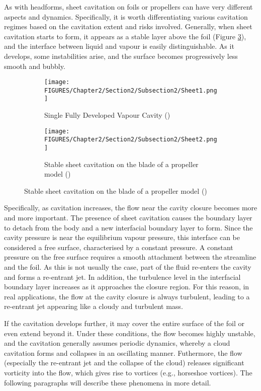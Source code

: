As with headforms, sheet cavitation on foils or propellers can have very different aspects and dynamics. Specifically, it is worth differentiating various cavitation regimes based on the cavitation extent and risks involved. 
Generally, when sheet cavitation starts to form, it appears as a stable layer above the foil (Figure \ref{fig:S2}), and the interface between liquid and vapour is easily distinguishable. As it develops, some instabilities arise, and the surface becomes progressively less smooth and bubbly. 

\begin{figure}[htbp!]
    \centering
    \begin{subfigure}{0.47\textwidth}
        \centering
        \texttt{[image: FIGURES/Chapter2/Section2/Subsection2/Sheet1.png]}
        \caption{Single Fully Developed Vapour Cavity (\cite{brennen2014cavitation})}
        \label{fig:S1}
    \end{subfigure}
    \hfill
    \begin{subfigure}{0.47\textwidth}
        \centering
        \texttt{[image: FIGURES/Chapter2/Section2/Subsection2/Sheet2.png]}
        \caption{Stable sheet cavitation on the blade of a propeller model (\cite{Kuiper1998})}
        \label{fig:S2}
    \end{subfigure}
\end{figure}

Specifically, as cavitation increases, the flow near the cavity closure becomes more and more important. 
The presence of sheet cavitation causes the boundary layer to detach from the body and a new interfacial boundary layer to form. Since the cavity pressure is near the equilibrium vapour pressure, this interface can be considered a free surface, characterised by a constant pressure.
A constant pressure on the free surface requires a smooth attachment between the streamline and the foil. As this is not usually the case, part of the fluid re-enters the cavity and forms a re-entrant jet. In addition, the turbulence level in the interfacial boundary layer increases as it approaches the closure region. For this reason, in real applications, the flow at the cavity closure is always turbulent, leading to a re-entrant jet appearing like a cloudy and turbulent mass.

If the cavitation develops further, it may cover the entire surface of the foil or even extend beyond it. Under these conditions, the flow becomes highly unstable, and the cavitation generally assumes periodic dynamics, whereby a cloud cavitation forms and collapses in an oscillating manner.
Futhermore, the flow (especially the re-entrant jet and the collapse of the cloud) releases significant vorticity into the flow, which gives rise to vortices (e.g., horseshoe vortices). The following paragraphs will describe these phenomena in more detail.

